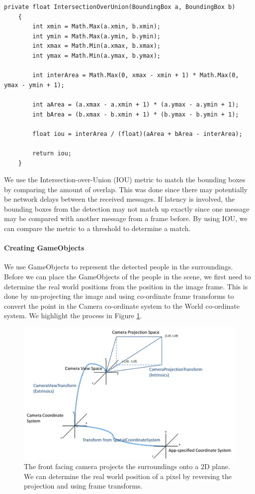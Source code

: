 \begin{lstlisting}[language={[Sharp]C},caption={IOU metric C\# implementation}]
private float IntersectionOverUnion(BoundingBox a, BoundingBox b)
    {
        int xmin = Math.Max(a.xmin, b.xmin);
        int ymin = Math.Max(a.ymin, b.ymin);
        int xmax = Math.Min(a.xmax, b.xmax);
        int ymax = Math.Min(a.ymax, b.ymax);

        int interArea = Math.Max(0, xmax - xmin + 1) * Math.Max(0, ymax - ymin + 1);

        int aArea = (a.xmax - a.xmin + 1) * (a.ymax - a.ymin + 1);
        int bArea = (b.xmax - b.xmin + 1) * (b.ymax - b.ymin + 1);

        float iou = interArea / (float)(aArea + bArea - interArea);

        return iou;
    }
\end{lstlisting}

We use the Intersection-over-Union (IOU) metric to match the bounding boxes by comparing the amount of overlap. This was done since there may potentially be network delays between the received messages. If latency is involved, the bounding boxes from the detection may not match up exactly since one message may be compared with another message from a frame before. By using IOU, we can compare the metric to a threshold to determine a match.

\paragraph{Creating GameObjects} We use GameObjects to represent the detected people in the surroundings. Before we can place the GameObjects of the people in the scene, we first need to determine the real world positions from the position in the image frame. This is done by un-projecting the image and using co-ordinate frame transforms to convert the point in the Camera co-ordinate system to the World co-ordinate system. We highlight the process in Figure \ref{fig:cameraProjection}.

\begin{figure}[ht]
	\centering
	\includegraphics[width=0.8\linewidth]{img/chapter5_implementation/CameraTransform.png}
	\caption{The front facing camera projects the surroundings onto a 2D plane. We can determine the real world position of a pixel by reversing the projection and using frame transforms.}
	\label{fig:cameraProjection}
\end{figure}

